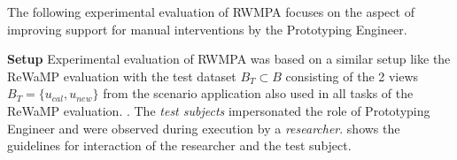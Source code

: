 The following experimental evaluation of RWMPA focuses on the aspect of improving support for manual interventions by the Prototyping Engineer.

\textbf{Setup} Experimental evaluation of RWMPA was based on a similar setup like the ReWaMP evaluation with the test dataset \(B_T \subset B\) consisting of the 2 views \(B_T = \{u_{cal}, u_{new}\}\) from the scenario application also used in all tasks of the ReWaMP evaluation.
.
The \emph{test subjects} impersonated the role of Prototyping Engineer and were observed during execution by a \emph{researcher}.
 shows the guidelines for interaction of the researcher and the test subject.

